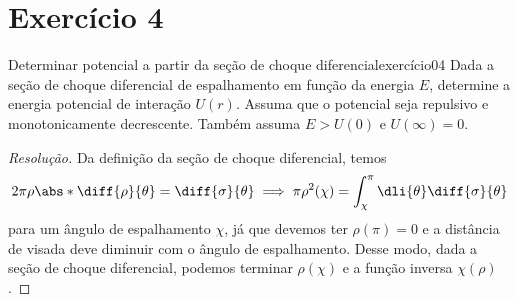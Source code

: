 \section*{Exercício 4}
\begin{exercício}{Determinar potencial a partir da seção de choque diferencial}{exercício04}
    Dada a seção de choque diferencial de espalhamento em função da energia \(E\), determine a energia potencial de interação \(U(r)\). Assuma que o potencial seja repulsivo e monotonicamente decrescente. Também assuma \(E > U(0)\) e \(U(\infty) = 0\).
\end{exercício}
\begin{proof}[Resolução]
    Da definição da seção de choque diferencial, temos
    \begin{equation*}
        2\pi \rho \abs*{\diff{\rho}{\theta}} = \diff{\sigma}{\theta} \implies \pi \rho^2(\chi) = \int_{\chi}^\pi \dli{\theta} \diff{\sigma}{\theta}
    \end{equation*}
    para um ângulo de espalhamento \(\chi\), já que devemos ter \(\rho(\pi) = 0\) e a distância de visada deve diminuir com o ângulo de espalhamento. Desse modo, dada a seção de choque diferencial, podemos terminar \(\rho(\chi)\) e a função inversa \(\chi(\rho)\).


\end{proof}
